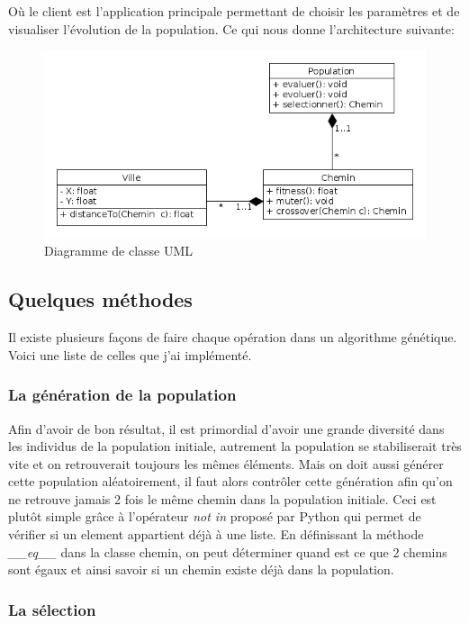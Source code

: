 \documentclass[11pt]{article}
\begin{document}
Où le client est l'application principale permettant de choisir les paramètres et de visualiser l'évolution de la population.
Ce qui nous donne l'architecture suivante:

\begin{figure}[H]
\centering
\includegraphics[width=.9\linewidth]{./UML_Class.png}
\caption{Diagramme de classe UML}
\end{figure}

\subsection{Quelques méthodes}
\label{sec-2-2}

Il existe plusieurs façons de faire chaque opération dans un algorithme génétique. Voici une liste de celles que j'ai
implémenté.

\subsubsection{La génération de la population}

Afin d'avoir de bon résultat, il est primordial d'avoir une grande diversité dans les individus de la population initiale,
autrement la population se stabiliserait très vite et on retrouverait toujours les mêmes éléments.
Mais on doit aussi générer cette population aléatoirement, il faut alors contrôler cette génération afin qu'on ne retrouve
jamais 2 fois le même chemin dans la population initiale. Ceci est plutôt simple grâce à l'opérateur \emph{not in}
proposé par Python qui permet de vérifier si un element appartient déjà à une liste. En définissant la méthode \emph{\_\_eq\_\_}
dans la classe chemin, on peut déterminer quand est ce que 2 chemins sont égaux et ainsi savoir si un chemin existe déjà dans
la population.

\subsubsection{La sélection}
\end{document}
